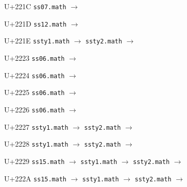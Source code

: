 \documentclass{article}
\begin{document}
\begin{substitutions}
U+221C  \linebreak
    \texttt{ss07.math} $\to$  

\goodbreak

U+221D  \linebreak
    \texttt{ss12.math} $\to$  

\goodbreak

U+221E  \linebreak
    \texttt{ssty1.math} $\to$  \linebreak
    \texttt{ssty2.math} $\to$  

\goodbreak

U+2223  \linebreak
    \texttt{ss06.math} $\to$  

\goodbreak

U+2224  \linebreak
    \texttt{ss06.math} $\to$  

\goodbreak

U+2225  \linebreak
    \texttt{ss06.math} $\to$  

\goodbreak

U+2226  \linebreak
    \texttt{ss06.math} $\to$  

\goodbreak

U+2227  \linebreak
    \texttt{ssty1.math} $\to$  \linebreak
    \texttt{ssty2.math} $\to$  

\goodbreak

U+2228  \linebreak
    \texttt{ssty1.math} $\to$  \linebreak
    \texttt{ssty2.math} $\to$  

\goodbreak

U+2229  \linebreak
    \texttt{ss15.math} $\to$  \linebreak
    \texttt{ssty1.math} $\to$  \linebreak
    \texttt{ssty2.math} $\to$  

\goodbreak

U+222A  \linebreak
    \texttt{ss15.math} $\to$  \linebreak
    \texttt{ssty1.math} $\to$  \linebreak
    \texttt{ssty2.math} $\to$  


\end{substitutions}
\end{document}
